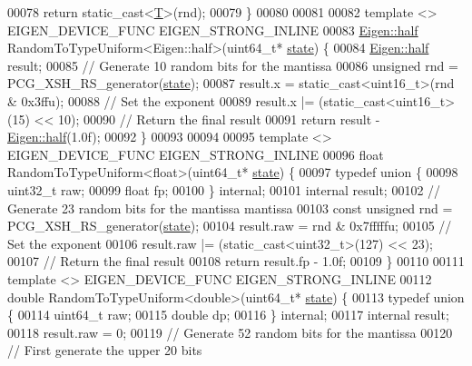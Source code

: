 \begin{DoxyCode}
00078   \textcolor{keywordflow}{return} \textcolor{keyword}{static\_cast<}\hyperlink{group___sparse_core___module_class_eigen_1_1_triplet}{T}\textcolor{keyword}{>}(rnd);
00079 \}
00080 
00081 
00082 \textcolor{keyword}{template} <> EIGEN\_DEVICE\_FUNC EIGEN\_STRONG\_INLINE
00083 \hyperlink{struct_eigen_1_1half}{Eigen::half} RandomToTypeUniform<Eigen::half>(uint64\_t* \hyperlink{structstate}{state}) \{
00084   \hyperlink{struct_eigen_1_1half}{Eigen::half} result;
00085   \textcolor{comment}{// Generate 10 random bits for the mantissa}
00086   \textcolor{keywordtype}{unsigned} rnd = PCG\_XSH\_RS\_generator(\hyperlink{structstate}{state});
00087   result.x = \textcolor{keyword}{static\_cast<}uint16\_t\textcolor{keyword}{>}(rnd & 0x3ffu);
00088   \textcolor{comment}{// Set the exponent}
00089   result.x |= (\textcolor{keyword}{static\_cast<}uint16\_t\textcolor{keyword}{>}(15) << 10);
00090   \textcolor{comment}{// Return the final result}
00091   \textcolor{keywordflow}{return} result - \hyperlink{struct_eigen_1_1half}{Eigen::half}(1.0f);
00092 \}
00093 
00094 
00095 \textcolor{keyword}{template} <> EIGEN\_DEVICE\_FUNC EIGEN\_STRONG\_INLINE
00096 \textcolor{keywordtype}{float} RandomToTypeUniform<float>(uint64\_t* \hyperlink{structstate}{state}) \{
00097   \textcolor{keyword}{typedef} \textcolor{keyword}{union }\{
00098     uint32\_t raw;
00099     \textcolor{keywordtype}{float} fp;
00100   \} \textcolor{keyword}{internal};
00101   \textcolor{keyword}{internal} result;
00102   \textcolor{comment}{// Generate 23 random bits for the mantissa mantissa}
00103   \textcolor{keyword}{const} \textcolor{keywordtype}{unsigned} rnd = PCG\_XSH\_RS\_generator(\hyperlink{structstate}{state});
00104   result.raw = rnd & 0x7fffffu;
00105   \textcolor{comment}{// Set the exponent}
00106   result.raw |= (\textcolor{keyword}{static\_cast<}uint32\_t\textcolor{keyword}{>}(127) << 23);
00107   \textcolor{comment}{// Return the final result}
00108   \textcolor{keywordflow}{return} result.fp - 1.0f;
00109 \}
00110 
00111 \textcolor{keyword}{template} <> EIGEN\_DEVICE\_FUNC EIGEN\_STRONG\_INLINE
00112 \textcolor{keywordtype}{double} RandomToTypeUniform<double>(uint64\_t* \hyperlink{structstate}{state}) \{
00113   \textcolor{keyword}{typedef} \textcolor{keyword}{union }\{
00114     uint64\_t raw;
00115     \textcolor{keywordtype}{double} dp;
00116   \} \textcolor{keyword}{internal};
00117   \textcolor{keyword}{internal} result;
00118   result.raw = 0;
00119   \textcolor{comment}{// Generate 52 random bits for the mantissa}
00120   \textcolor{comment}{// First generate the upper 20 bits}

\end{DoxyCode}
